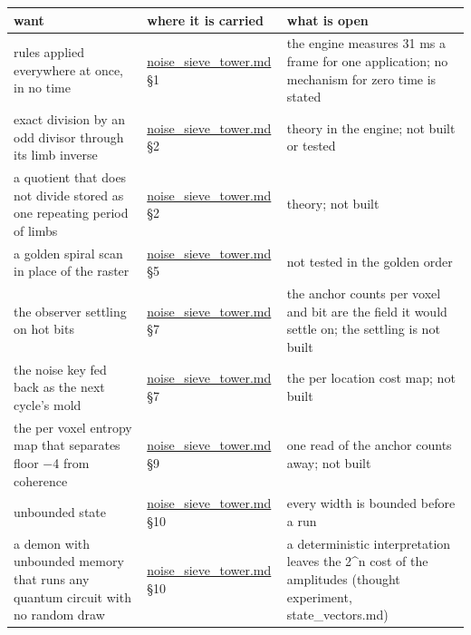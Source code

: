 {\small
\setlength{\tabcolsep}{6pt}
\begin{longtable}{>{\RaggedRight\arraybackslash}p{}>{\RaggedRight\arraybackslash}p{}>{\RaggedRight\arraybackslash}p{}}
\toprule
want & where it is carried & what is open \\
\midrule
\endhead
rules applied everywhere at once, in no time & \hyperref[chap:noise-sieve-tower]{noise\_\allowbreak{}sieve\_\allowbreak{}tower.md} §1 & the engine measures 31 ms a frame for one application; no mechanism for zero time is stated \\
exact division by an odd divisor through its limb inverse & \hyperref[chap:noise-sieve-tower]{noise\_\allowbreak{}sieve\_\allowbreak{}tower.md} §2 & theory in the engine; not built or tested \\
a quotient that does not divide stored as one repeating period of limbs & \hyperref[chap:noise-sieve-tower]{noise\_\allowbreak{}sieve\_\allowbreak{}tower.md} §2 & theory; not built \\
a golden spiral scan in place of the raster & \hyperref[chap:noise-sieve-tower]{noise\_\allowbreak{}sieve\_\allowbreak{}tower.md} §5 & not tested in the golden order \\
the observer settling on hot bits & \hyperref[chap:noise-sieve-tower]{noise\_\allowbreak{}sieve\_\allowbreak{}tower.md} §7 & the anchor counts per voxel and bit are the field it would settle on; the settling is not built \\
the noise key fed back as the next cycle's mold & \hyperref[chap:noise-sieve-tower]{noise\_\allowbreak{}sieve\_\allowbreak{}tower.md} §7 & the per location cost map; not built \\
the per voxel entropy map that separates floor −4 from coherence & \hyperref[chap:noise-sieve-tower]{noise\_\allowbreak{}sieve\_\allowbreak{}tower.md} §9 & one read of the anchor counts away; not built \\
unbounded state & \hyperref[chap:noise-sieve-tower]{noise\_\allowbreak{}sieve\_\allowbreak{}tower.md} §10 & every width is bounded before a run \\
a demon with unbounded memory that runs any quantum circuit with no random draw & \hyperref[chap:noise-sieve-tower]{noise\_\allowbreak{}sieve\_\allowbreak{}tower.md} §10 & a deterministic interpretation leaves the 2\textasciicircum{}n cost of the amplitudes (thought experiment, state\_\allowbreak{}vectors.md) \\

\end{longtable}}
